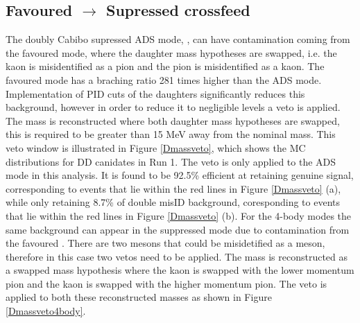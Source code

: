 \subsection{Favoured $\to$ Supressed crossfeed}
\label{sec:backgrounds:crossfeed}

The doubly Cabibo supressed ADS mode, \decay{\Bm}{\D(\Kp\pim)\Kstarm}, can have contamination coming from the favoured \decay{\Bm}{\D(\Km\pip)\Kstarm} mode, where the daughter mass hypotheses are swapped, i.e. the kaon is misidentified as a pion and the pion is misidentified as a kaon. The favoured mode has a braching ratio 281 times higher than the ADS mode. Implementation of PID cuts of the \D daughters significantly reduces this background, however in order to reduce it to negligible levels a veto is applied. The \Dz mass is reconstructed where both daughter mass hypotheses are swapped, this is required to be greater than 15 MeV away from the nominal \Dz mass. This veto window is illustrated in Figure \ref{Dmassveto}, which shows the MC distributions for DD canidates in Run 1. The veto is only applied to the ADS mode in this analysis. It is found to be 92.5\% efficient at retaining genuine signal, corresponding to events that lie within the red lines in Figure \ref{Dmassveto} (a), while only retaining 8.7\% of double misID background, coresponding to events that lie within the red lines in Figure \ref{Dmassveto} (b). For the 4-body modes the same background can appear in the suppressed \decay{\Bm}{\D(\Kp\pim\pip\pim)\Kstarm} mode due to contamination from the favoured \decay{\Bm}{\D(\Km\pip\pim\pip)\Kstarm}. There are two \pip mesons that could be misidetified as a \Kp meson, therefore in this case two vetos need to be applied. The \Dz mass is reconstructed as a swapped mass hypothesis where the kaon is swapped with the lower momentum pion and the kaon is swapped with the higher momentum pion. The veto is applied to both these reconstructed masses as shown in Figure \ref{Dmassveto4body}.

